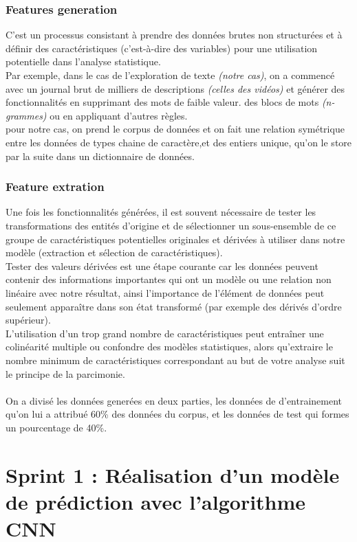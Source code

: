 \subsection{Features generation}
C'est un processus consistant à prendre des données brutes non structurées et à définir des caractéristiques (c'est-à-dire des variables) pour une utilisation potentielle dans l'analyse statistique.\\
 Par exemple, dans le cas de l'exploration de texte \textit{(notre cas)}, on a  commencé avec un journal brut de milliers de descriptions \textit{(celles des vidéos)} et générer des fonctionnalités en supprimant des mots de faible valeur. des blocs de mots \textit{(n-grammes)} ou en appliquant d'autres règles.\\[0.5cm]
pour notre cas, on prend le corpus de données et on fait une relation symétrique entre les données de types chaine de caractère,et des entiers unique, qu'on le store par la suite dans un dictionnaire de données.
\subsection{Feature extration}
Une fois les fonctionnalités générées, il est souvent nécessaire de tester les transformations des entités d'origine et de sélectionner un sous-ensemble de ce groupe de caractéristiques potentielles originales et dérivées à utiliser dans notre modèle (extraction et sélection de caractéristiques).\\[0.2cm]
Tester des valeurs dérivées est une étape courante car les données peuvent contenir des informations importantes qui ont un modèle ou une relation non linéaire avec notre résultat, ainsi l'importance de l'élément de données peut seulement apparaître dans son état transformé (par exemple des dérivés d'ordre supérieur).\\[0.2cm]
 L'utilisation d'un trop grand nombre de caractéristiques peut entraîner une colinéarité multiple ou confondre des modèles statistiques, alors qu'extraire le nombre minimum de caractéristiques correspondant au but de votre analyse suit le principe de la parcimonie.\\[0.2cm]
\\On a divisé les données generées en deux parties, les données de d'entrainement qu'on lui a attribué 60\% des données du corpus, et les données de test qui formes un pourcentage de 40\%. 
\chapter{Sprint 1 : Réalisation d’un modèle de prédiction avec l’algorithme CNN}
\label{Chapitre 4} %

